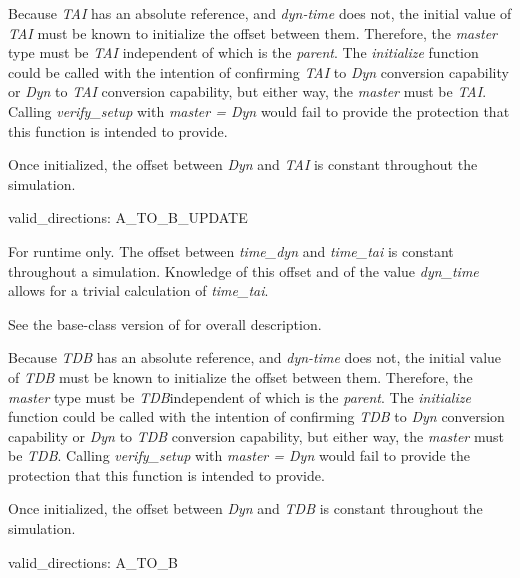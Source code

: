 {\begin{enumerate}
{\begin{enumerate}
Because \textit{TAI} has an absolute reference, and \textit{dyn-time}
does not, the initial value of \textit{TAI} must be known to initialize
the offset between them.  Therefore, the \textit{master} type must be
\textit{TAI} independent of which is the \textit{parent}.  The
\textit{initialize} function could be called with the intention of
confirming \textit{TAI} to \textit{Dyn} conversion capability or
\textit{Dyn} to \textit{TAI} conversion capability, but either way, the
\textit{master} must be \textit{TAI}. Calling \textit{verify\_setup}
with\textit{ master = Dyn }would fail to provide the protection that
this function is intended to provide.

Once initialized, the offset between \textit{Dyn} and \textit{TAI} is
constant throughout the simulation.

valid\_directions:
A\_TO\_B\_UPDATE

For runtime only.  The offset between \textit{time\_dyn} and
\textit{time\_tai }is constant throughout a simulation.
Knowledge of this
offset and of the value \textit{dyn\_time} allows for a trivial calculation of
\textit{time\_tai}.
\end{enumerate}}





{\begin{enumerate}
\label{ref:TimeConverterdyntdbinitialize}
See the base-class version of
 for overall description.

Because \textit{TDB} has an absolute reference, and \textit{dyn-time}
does not, the initial value of \textit{TDB} must be known to initialize
the offset between them.  Therefore, the \textit{master} type must be
\textit{TDB}independent of which is the \textit{parent}.  The
\textit{initialize} function could be called with the intention of
confirming \textit{TDB} to \textit{Dyn} conversion capability or
\textit{Dyn} to \textit{TDB} conversion capability, but either way, the
\textit{master} must be \textit{TDB}. Calling \textit{verify\_setup}
with\textit{ master = Dyn }would fail to provide the protection that
this function is intended to provide.

Once initialized, the offset between \textit{Dyn} and \textit{TDB} is
constant throughout the simulation.

valid\_directions:
A\_TO\_B


\end{enumerate}}
\end{enumerate}}
